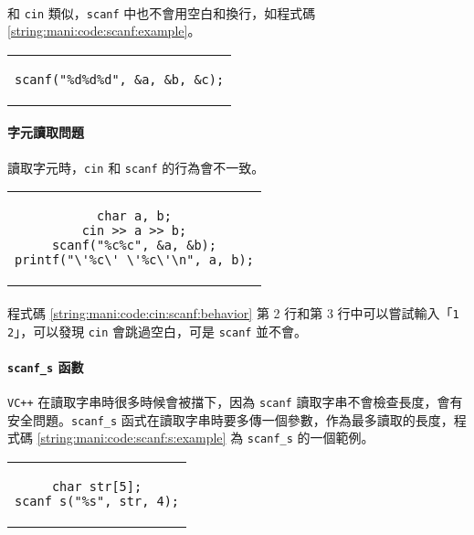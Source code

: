 \documentclass[12pt,a4paper,oneside]{article}
\begin{document}
\begin{CJK}{UTF8}{bkai}
\paragraph{}和 \lstinline!cin! 類似，\lstinline!scanf! 中也不會用空白和換行，如程式碼 \ref{string:mani:code:scanf:example}。

\begin{code}[h!]
  \centering
  \begin{tabular}{c}
  \begin{lstlisting}
scanf("%d%d%d", &a, &b, &c);
  \end{lstlisting}
  \end{tabular}
  \caption{\lstinline!scanf! 範例}
  \label{string:mani:code:scanf:example}
\end{code}

\paragraph{字元讀取問題}讀取字元時，\lstinline!cin! 和 \lstinline!scanf! 的行為會不一致。

\begin{code}[h!]
  \centering
  \begin{tabular}{c}
  \begin{lstlisting}
char a, b;
cin >> a >> b;
scanf("%c%c", &a, &b);
printf("\'%c\' \'%c\'\n", a, b);
  \end{lstlisting}
  \end{tabular}
  \caption{\lstinline!cin! 和 \lstinline!scanf! 行為不一致}
  \label{string:mani:code:cin:scanf:behavior}
\end{code}

\paragraph{}程式碼 \ref{string:mani:code:cin:scanf:behavior} 第 2 行和第 3 行中可以嘗試輸入「\lstinline!1 2!」，可以發現 \lstinline!cin! 會跳過空白，可是 \lstinline!scanf! 並不會。
\paragraph{\lstinline!scanf_s! 函數}\texttt{VC++} 在讀取字串時很多時候會被擋下，因為 \lstinline!scanf! 讀取字串不會檢查長度，會有安全問題。\lstinline!scanf_s! 函式在讀取字串時要多傳一個參數，作為最多讀取的長度，程式碼 \ref{string:mani:code:scanf:s:example} 為 \lstinline!scanf_s! 的一個範例。

\begin{code}[h!]
  \centering
  \begin{tabular}{c}
  \begin{lstlisting}
char str[5];
scanf_s("%s", str, 4);
  \end{lstlisting}
  \end{tabular}
  \caption{\lstinline!scanf_s! 的範例}
  \label{string:mani:code:scanf:s:example}
\end{code}


\end{CJK}
\end{document}
